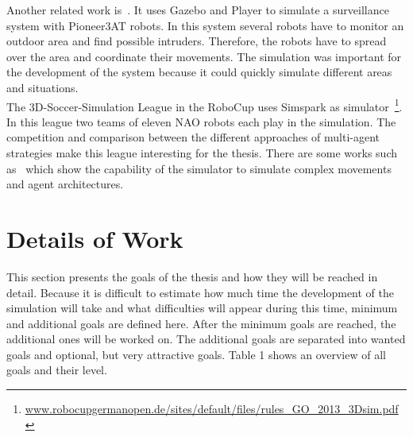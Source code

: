 \documentclass[11pt,a4paper]{article}
\begin{document}
Another related work is~\cite{SurveillanceSystem}. It uses Gazebo and Player to simulate a surveillance system with Pioneer3AT robots. In this system several robots have to monitor an outdoor area and find possible intruders. Therefore, the robots have to spread over the area and coordinate their movements. The simulation was important for the development of the system because it could quickly simulate different areas and situations.\\
The 3D-Soccer-Simulation League in the RoboCup uses Simspark as simulator~\footnote{\url{www.robocupgermanopen.de/sites/default/files/rules_GO_2013_3Dsim.pdf}}. In this league two teams of eleven NAO robots each play in the simulation. The competition and comparison between the different approaches of multi-agent strategies make this league interesting for the thesis. There are some works such as~\cite{SoccerChampion} which show the capability of the simulator to simulate complex movements and agent architectures.

\section{Details of Work}
This section presents the goals of the thesis and how they will be reached in detail. Because it is difficult to estimate how much time the development of the simulation will take and what difficulties will appear during this time, minimum and additional goals are defined here. After the minimum goals are reached, the additional ones will be worked on. The additional goals are separated into wanted goals and optional, but very attractive goals. Table 1 shows an overview of all goals and their level.
\end{document}
